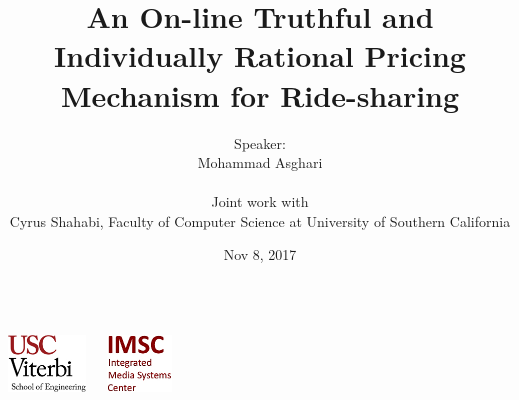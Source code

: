 \documentclass[t]{beamer}
\begin{document}
\graphicspath{ {Graphics/} }

\title[USC Viterbi School of Engineering]{An On-line Truthful and Individually Rational Pricing Mechanism for Ride-sharing}  
\author[Mohammad Asghari]{\small{Speaker:}\\Mohammad Asghari\\
\vspace{0.05in}
\begin{flushleft}
\tiny{
\hspace{1.25in}Joint work with\\
\hspace{1.25in}Cyrus Shahabi, Faculty of Computer Science at University of Southern California}\\
\vspace{-0.25in}
\end{flushleft}}

\date{Nov 8, 2017} 
\begin{frame}
\titlepage
\vspace{-0.5in}
\begin{columns}
  \begin{center}
    \includegraphics[height=1.5cm]{viterbi_logo.jpg}
  \end{center}
  \begin{center}
    \includegraphics[height=1.5cm]{imsc_logo.jpg}   
  \end{center}
\end{columns} 
\end{frame}
\end{document}

